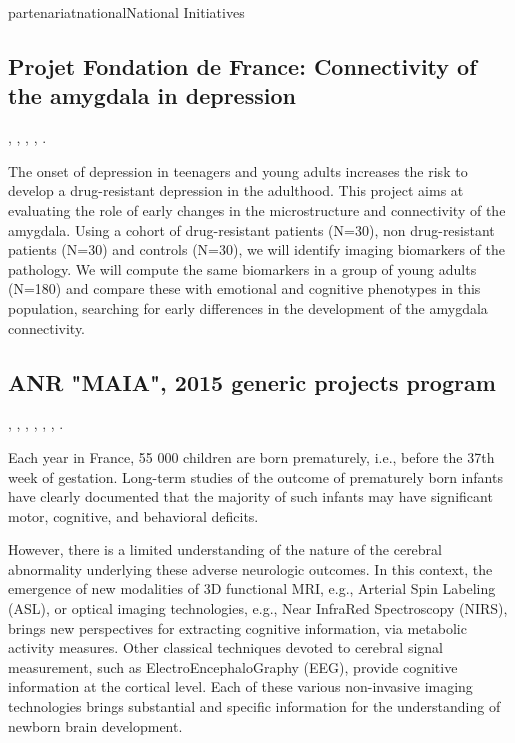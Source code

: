 \documentclass{ra2018}
\begin{document}
\begin{module}{partenariat}{national}{National Initiatives}
    \subsection{Projet Fondation de France: Connectivity of the amygdala in depression}
    \begin{participants}
      ,
      , 
      , 
      , 
      .
    \end{participants}
    The onset of depression in teenagers and young adults increases the risk to
    develop a drug-resistant depression in the adulthood. This project aims at
    evaluating the role of early changes in the microstructure and connectivity of
    the amygdala. Using a cohort of drug-resistant patients (N=30), non
    drug-resistant patients (N=30) and controls (N=30), we will identify imaging
    biomarkers of the pathology. We will compute the same biomarkers in a group of
    young adults (N=180) and compare these with emotional and cognitive phenotypes
    in this population, searching for early differences in the development of the
    amygdala connectivity.

 
       
        \subsection{ANR "MAIA", 2015 generic projects program}
        \label{sssec:anr_maia}
        \begin{participants}
          ,
          ,
          ,
          ,
          ,
          ,
          .
        \end{participants}
        Each year in France, 55 000 children are born prematurely, i.e., before the
        37th week of gestation. Long-term studies of the outcome of prematurely born
        infants have clearly documented that the majority of such infants may have
        significant motor, cognitive, and behavioral deficits.
        
        However, there is a limited understanding of the nature of the cerebral
        abnormality underlying these adverse neurologic outcomes.  In this context, the
        emergence of new modalities of 3D functional MRI, e.g., Arterial Spin Labeling
        (ASL), or optical imaging technologies, e.g., Near InfraRed Spectroscopy
        (NIRS), brings new perspectives for extracting cognitive information, via
        metabolic activity measures. Other classical techniques devoted to cerebral
        signal measurement, such as ElectroEncephaloGraphy (EEG), provide cognitive
        information at the cortical level. Each of these various non-invasive imaging
        technologies brings substantial and specific information for the understanding
        of newborn brain development.
        

\end{module}
\end{document}
